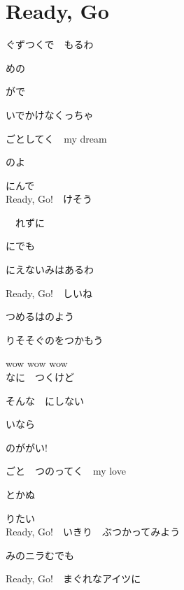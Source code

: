\section{ Ready, Go}
\large{

ぐずつくで　もるわ

めの

がで

いでかけなくっちゃ

ごとしてく　my dream

のよ

にんで
\\

Ready, Go!　けそう

　れずに

にでも

にえないみはあるわ

Ready, Go!　しいね

つめるはのよう

りそそぐのをつかもう

wow wow wow
\\

なに　つくけど

そんな　にしない

いなら　

のががい!

ごと　つのってく　my love

とかぬ

りたい
\\

Ready, Go!　いきり　ぶつかってみよう

みのニラむでも

Ready, Go!　まぐれなアイツに

}
